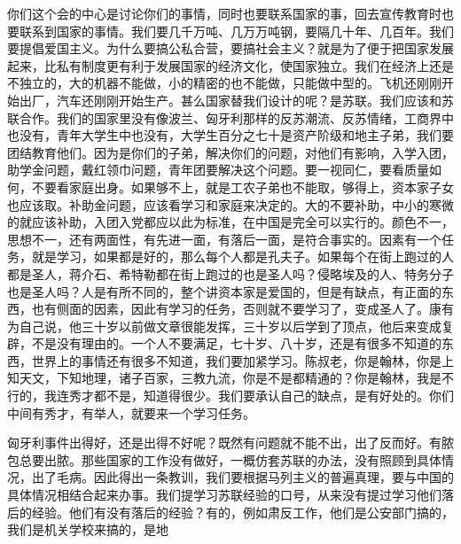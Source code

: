 你们这个会的中心是讨论你们的事情，同时也要联系国家的事，回去宣传教育时也要联系到国家的事情。我们要几千万吨、几万万吨钢，要隔几十年、几百年。我们要提倡爱国主义。为什么要搞公私合营，要搞社会主义？就是为了便于把国家发展起来，比私有制度更有利于发展国家的经济文化，使国家独立。我们在经济上还是不独立的，大的机器不能做，小的精密的也不能做，只能做中型的。飞机还刚刚开始出厂，汽车还刚刚开始生产。甚么国家替我们设计的呢？是苏联。我们应该和苏联合作。我们的国家里没有像波兰、匈牙利那样的反苏潮流、反苏情绪，工商界中也没有，青年大学生中也没有，大学生百分之七十是资产阶级和地主子弟，我们要团结教育他们。因为是你们的子弟，解决你们的问题，对他们有影响，入学入团，助学金问题，戴红领巾问题，青年团要解决这个问题。要一视同仁，要看质量如何，不要看家庭出身。如果够不上，就是工农子弟也不能取，够得上，资本家子女也应该取。补助金问题，应该看学习和家庭来决定的。大的不要补助，中小的寒微的就应该补助，入团入党都应以此为标准，在中国是完全可以实行的。颜色不一，思想不一，还有两面性，有先进一面，有落后一面，是符合事实的。因素有一个任务，就是学习，如果都是好的，那么每个人都是孔夫子。如果每个在街上跑过的人都是圣人，蒋介石、希特勒都在街上跑过的也是圣人吗？侵略埃及的人、特务分子也是圣人吗？人是有所不同的，整个讲资本家是爱国的，但是有缺点，有正面的东西，也有侧面的因素，因此有学习的任务，否则就不要学习了，变成圣人了。康有为自己说，他三十岁以前做文章很能发挥，三十岁以后学到了顶点，他后来变成复辟，不是没有理由的。一个人不要满足，七十岁、八十岁，还是有很多不知道的东西，世界上的事情还有很多不知道，我们要加紧学习。陈叔老，你是翰林，你是上知天文，下知地理，诸子百家，三教九流，你是不是都精通的？你是翰林，我是不行的，我连秀才都不是，知道得很少。我们要承认自己的缺点，是有好处的。你们中间有秀才，有举人，就要来一个学习任务。

匈牙利事件出得好，还是出得不好呢？既然有问题就不能不出，出了反而好。有脓包总要出脓。那些国家的工作没有做好，一概仿套苏联的办法，没有照顾到具体情况，出了毛病。因此得出一条教训，我们要根据马列主义的普遍真理，要与中国的具体情况相结合起来办事。我们提学习苏联经验的口号，从来没有提过学习他们落后的经验。他们有没有落后的经验？有的，例如肃反工作，他们是公安部门搞的，我们是机关学校来搞的，是地

